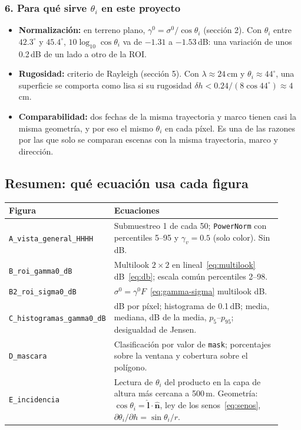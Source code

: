 \documentclass[11pt,a4paper]{article}
\begin{document}
\subsubsection*{6. Para qué sirve $\theta_i$ en este proyecto}

\begin{itemize}
  \item \textbf{Normalización:} en terreno plano, $\gamma^0 = \sigma^0/\cos\theta_i$ (sección 2). Con $\theta_i$ entre $42.3^\circ$ y
        $45.4^\circ$, $10\log_{10}\cos\theta_i$ va de $-1.31$ a $-1.53$\,dB: una variación de unos 0.2\,dB de un lado a otro de la ROI.
  \item \textbf{Rugosidad:} criterio de Rayleigh (sección 5). Con $\lambda \approx 24$\,cm y $\theta_i \approx 44^\circ$, una
        superficie se comporta como lisa si su rugosidad $\delta h < 0.24/(8\cos 44^\circ) \approx 4$\,cm.
  \item \textbf{Comparabilidad:} dos fechas de la misma trayectoria y marco tienen casi la misma geometría, y por eso el mismo
        $\theta_i$ en cada píxel. Es una de las razones por las que solo se comparan escenas con la misma trayectoria, marco y
        dirección.
\end{itemize}

\subsection{Resumen: qué ecuación usa cada figura}

\begin{longtable}{p{0.30\linewidth}p{0.62\linewidth}}
\toprule
\textbf{Figura} & \textbf{Ecuaciones} \\
\midrule
\endhead
\texttt{A\_vista\_general\_HHHH} & Submuestreo 1 de cada 50; \texttt{PowerNorm} con percentiles 5--95 y $\gamma_v = 0.5$ (solo color). Sin dB. \\
\texttt{B\_roi\_gamma0\_dB} & Multilook $2\times2$ en lineal~\eqref{eq:multilook} \flecha{} dB~\eqref{eq:db}; escala común percentiles 2--98. \\
\texttt{B2\_roi\_sigma0\_dB} & $\sigma^0 = \gamma^0 F$~\eqref{eq:gamma-sigma} \flecha{} multilook \flecha{} dB. \\
\texttt{C\_histogramas\_gamma0\_dB} & dB por píxel; histograma de 0.1\,dB; media, mediana, dB de la media, $p_5$--$p_{95}$; desigualdad de Jensen. \\
\texttt{D\_mascara} & Clasificación por valor de \texttt{mask}; porcentajes sobre la ventana y cobertura sobre el polígono. \\
\texttt{E\_incidencia} & Lectura de $\theta_i$ del producto en la capa de altura más cercana a 500\,m. Geometría: $\cos\theta_i = \hat{\mathbf l}\cdot\hat{\mathbf n}$, ley de los senos~\eqref{eq:senos}, $\partial\theta_i/\partial h = \sin\theta_i/r$. \\
\bottomrule
\end{longtable}
\end{document}
